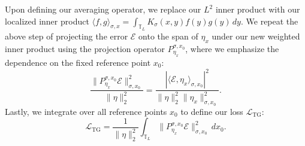 \documentclass{article}
\begin{document}
Upon defining our averaging operator, we replace our $L^2$ inner product
with our localized inner product
$\langle f,g\rangle_{\sigma,x}=\int_{\mathbb T_L}K_\sigma(x,y)f(y)g(y)\,dy$.
We repeat the above step of projecting the error $\mathcal E$ onto the span
of $\eta_x$ under our new weighted inner product using the projection
operator $P_{\eta_x}^{\sigma,x_0}$, where we emphasize the dependence on
the fixed reference point $x_0$:
\[
\frac{\|P_{\eta_x}^{\sigma,x_0}\mathcal E\|^2_{\sigma,x_0}}
     {\|\eta\|_2^2}
=\frac{|\langle\mathcal E,\eta_x\rangle_{\sigma,x_0}|^2}
     {\|\eta\|_2^2\|\eta_x\|_{\sigma,x_0}^2}.
\]
Lastly, we integrate over all reference points $x_0$ to define our loss
$\mathcal L_{\mathrm{TG}}$:
\begin{equation}
    \mathcal L_{\mathrm{TG}}=\frac1{\|\eta\|_2^2}
    \int_{\mathbb T_L}\|P_{\eta_x}^{\sigma,x_0}\mathcal E\|^2_{\sigma,x_0}\,dx_0.
\end{equation}
\end{document}
